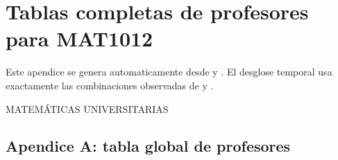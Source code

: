 \clearpage

\appendix

\section{Tablas completas de profesores para MAT1012}

Este apendice se genera automaticamente desde  y . El desglose temporal usa exactamente las combinaciones observadas de  y .

MATEMÁTICAS UNIVERSITARIAS

\subsection{Apendice A: tabla global de profesores}

